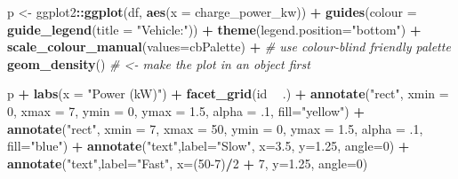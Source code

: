 \documentclass[]{article}
\newenvironment{Shaded}{\begin{snugshade}}{\end{snugshade}}
\newcommand{\KeywordTok}[1]{\textcolor[rgb]{0.13,0.29,0.53}{\textbf{#1}}}
\newcommand{\DataTypeTok}[1]{\textcolor[rgb]{0.13,0.29,0.53}{#1}}
\newcommand{\DecValTok}[1]{\textcolor[rgb]{0.00,0.00,0.81}{#1}}
\newcommand{\FloatTok}[1]{\textcolor[rgb]{0.00,0.00,0.81}{#1}}
\newcommand{\StringTok}[1]{\textcolor[rgb]{0.31,0.60,0.02}{#1}}
\newcommand{\CommentTok}[1]{\textcolor[rgb]{0.56,0.35,0.01}{\textit{#1}}}
\newcommand{\OperatorTok}[1]{\textcolor[rgb]{0.81,0.36,0.00}{\textbf{#1}}}
\newcommand{\NormalTok}[1]{#1}
\begin{document}
\begin{Shaded}
\begin{Highlighting}[]
\NormalTok{p <-}\StringTok{ }\NormalTok{ggplot2}\OperatorTok{::}\KeywordTok{ggplot}\NormalTok{(df, }\KeywordTok{aes}\NormalTok{(}\DataTypeTok{x =}\NormalTok{ charge_power_kw)) }\OperatorTok{+}
\StringTok{  }\KeywordTok{guides}\NormalTok{(}\DataTypeTok{colour =} \KeywordTok{guide_legend}\NormalTok{(}\DataTypeTok{title =} \StringTok{"Vehicle:"}\NormalTok{)) }\OperatorTok{+}
\StringTok{  }\KeywordTok{theme}\NormalTok{(}\DataTypeTok{legend.position=}\StringTok{"bottom"}\NormalTok{) }\OperatorTok{+}
\StringTok{  }\KeywordTok{scale_colour_manual}\NormalTok{(}\DataTypeTok{values=}\NormalTok{cbPalette) }\OperatorTok{+}\StringTok{ }\CommentTok{# use colour-blind friendly palette}
\StringTok{  }\KeywordTok{geom_density}\NormalTok{() }\CommentTok{# <- make the plot in an object first}

\NormalTok{p }\OperatorTok{+}\StringTok{ }\KeywordTok{labs}\NormalTok{(}\DataTypeTok{x =} \StringTok{"Power (kW)"}\NormalTok{) }\OperatorTok{+}\StringTok{ }\KeywordTok{facet_grid}\NormalTok{(id }\OperatorTok{~}\StringTok{ }\NormalTok{.) }\OperatorTok{+}
\StringTok{    }\KeywordTok{annotate}\NormalTok{(}\StringTok{"rect"}\NormalTok{, }\DataTypeTok{xmin =} \DecValTok{0}\NormalTok{, }\DataTypeTok{xmax =} \DecValTok{7}\NormalTok{, }\DataTypeTok{ymin =} \DecValTok{0}\NormalTok{, }\DataTypeTok{ymax =} \FloatTok{1.5}\NormalTok{,}
           \DataTypeTok{alpha =} \FloatTok{.1}\NormalTok{, }\DataTypeTok{fill=}\StringTok{"yellow"}\NormalTok{) }\OperatorTok{+}
\StringTok{  }\KeywordTok{annotate}\NormalTok{(}\StringTok{"rect"}\NormalTok{, }\DataTypeTok{xmin =} \DecValTok{7}\NormalTok{, }\DataTypeTok{xmax =} \DecValTok{50}\NormalTok{, }\DataTypeTok{ymin =} \DecValTok{0}\NormalTok{, }\DataTypeTok{ymax =} \FloatTok{1.5}\NormalTok{,}
           \DataTypeTok{alpha =} \FloatTok{.1}\NormalTok{, }\DataTypeTok{fill=}\StringTok{"blue"}\NormalTok{) }\OperatorTok{+}
\StringTok{  }\KeywordTok{annotate}\NormalTok{(}\StringTok{"text"}\NormalTok{,}\DataTypeTok{label=}\StringTok{"Slow"}\NormalTok{, }\DataTypeTok{x=}\FloatTok{3.5}\NormalTok{, }\DataTypeTok{y=}\FloatTok{1.25}\NormalTok{, }\DataTypeTok{angle=}\DecValTok{0}\NormalTok{) }\OperatorTok{+}
\StringTok{  }\KeywordTok{annotate}\NormalTok{(}\StringTok{"text"}\NormalTok{,}\DataTypeTok{label=}\StringTok{"Fast"}\NormalTok{, }\DataTypeTok{x=}\NormalTok{(}\DecValTok{50-7}\NormalTok{)}\OperatorTok{/}\DecValTok{2} \OperatorTok{+}\StringTok{ }\DecValTok{7}\NormalTok{, }\DataTypeTok{y=}\FloatTok{1.25}\NormalTok{, }\DataTypeTok{angle=}\DecValTok{0}\NormalTok{)}
\end{Highlighting}
\end{Shaded}
\end{document}
